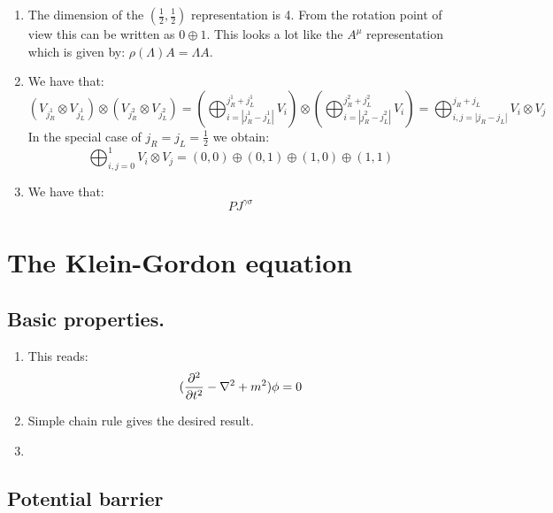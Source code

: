 \documentclass[10pt,a4paper]{book}
\begin{document}
\begin{enumerate}
\item The dimension of the $(\frac{1}{2}, \frac{1}{2})$ representation is 4. From the rotation point of view this can be written as $0 \oplus 1$. This looks a lot like the $A^\mu$ representation which is given by: $\rho(\Lambda) A = \Lambda A$. 

\item We have that:
\[
(V_{j_R^1} \otimes V_{j_L^1}) \otimes (V_{j_R^2} \otimes V_{j_L^2}) = \left(\bigoplus_{i = |j_R^1 - j_L^1|}^{j_R^1 + j_L^1} V_i \right) \otimes \left(\bigoplus_{i = |j_R^2 - j_L^2|}^{j_R^2 + j_L^2} V_i \right) = \bigoplus_{i, j = |j_R - j_L|}^{j_R + j_L} V_i \otimes V_j
\]
In the special case of $j_R = j_L = \frac{1}{2}$ we obtain:
\[
\bigoplus_{i, j = 0}^1 V_i \otimes V_j = (0, 0) \oplus (0, 1) \oplus (1, 0) \oplus (1, 1)
\]

\item We have that:
\[
P J^{\gamma \sigma} 
\]

\end{enumerate}

\chapter{The Klein-Gordon equation}

\section{Basic properties.}
\begin{enumerate}

\item This reads:
\[
(\pdv[2]{}{t} - \laplacian + m^2) \phi = 0
\]

\item Simple chain rule gives the desired result.

\item 

\end{enumerate}

\section{Potential barrier}
\end{document}
